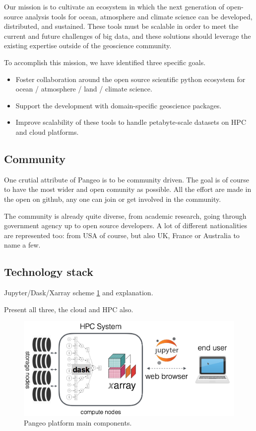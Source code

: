 \documentclass{article}
\begin{document}
Our mission is to cultivate an ecosystem in which the next generation of open-source analysis tools for ocean, atmosphere and climate science can be developed, distributed, and sustained. These tools must be scalable in order to meet the current and future challenges of big data, and these solutions should leverage the existing expertise outside of the geoscience community.

To accomplish this mission, we have identified three specific goals.
\begin{itemize}
\item Foster collaboration around the open source scientific python ecosystem for ocean / atmosphere / land / climate science.
\item Support the development with domain-specific geoscience packages.
\item Improve scalability of these tools to handle petabyte-scale datasets on HPC and cloud platforms.
\end{itemize}

\subsection{Community}
\label{ssec:community}

One crutial attribute of Pangeo is to be community driven. The goal is of course to have the most wider and open comunity as possible. All the effort are made in the open on github, any one can join or get involved in the community. 

The community is already quite diverse, from academic research, going through government agency up to open source developers. A lot of different nationalities are represented too: from USA of course, but also UK, France or Australia to name a few.

\subsection{Technology stack}
\label{ssec:techstack}

Jupyter/Dask/Xarray scheme \ref{pangeo_stack} and explanation.

Present all three, the cloud and HPC also.

\begin{figure}
  \centering
  \includegraphics[width=\columnwidth]{pangeo_stack.png}
  \caption{\label{pangeo_stack} Pangeo platform main components.}
\end{figure}
\end{document}
